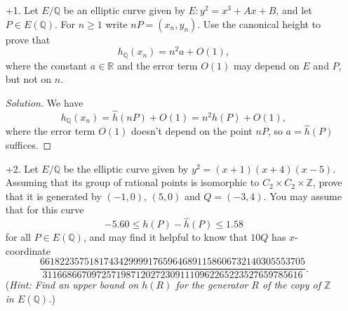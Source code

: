 \documentclass[a4paper]{article}
\theoremstyle{plain}
\theoremstyle{remark}
\theoremstyle{definition}
\newcommand{\Z}{\mathbb{Z}}
\newcommand{\Q}{\mathbb{Q}}
\newcommand{\R}{\mathbb{R}}
\begin{document}
\begin{enumerate}
    \item[+1.] Let $E/\Q$ be an elliptic curve given by $E:y^2=x^3+Ax+B$, and
        let $P\in E(\Q)$. For $n\ge1$ write $nP=(x_n,y_n)$. Use the canonical
        height to prove that
        \begin{equation*}
            h_\Q(x_n) = n^2a+O(1),
        \end{equation*}
        where the constant $a\in\R$ and the error term $O(1)$ may depend on $E$
        and $P$, but not on $n$.

        \begin{proof}[Solution]
            We have
            \begin{equation*}
                h_\Q(x_n)
                    = \hat h(nP) + O(1)
                    = n^2\hat h(P) + O(1),
            \end{equation*}
            where the error term $O(1)$ doesn't depend on the point $nP$, so
            $a=\hat h(P)$ suffices.
        \end{proof}

    \item[+2.] Let $E/\Q$ be the elliptic curve given by $y^2=(x+1)(x+4)(x-5)$.
        Assuming that its group of rational points is isomorphic to
        $C_2\times C_2\times\Z$, prove that it is generated by $(-1,0)$, $(5,0)$
        and $Q=(-3,4)$. You may assume that for this curve
        \begin{equation*}
            -5.60 \le h(P) - \hat h(P) \le 1.58
        \end{equation*}
        for all $P\in E(\Q)$, and may find it helpful to know that $10Q$ has
        $x$-coordinate
        \begin{equation*}
            \frac{661822357518174342999917659646891158606732140305553705}
                {31166866709725719871202723091110962265223527659785616}.
        \end{equation*}
        (\textit{Hint: Find an upper bound on $h(R)$ for the generator $R$ of
        the copy of $\Z$ in $E(\Q)$.})


\end{enumerate}
\end{document}
